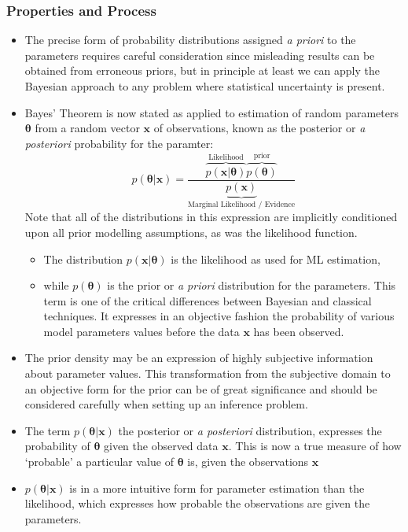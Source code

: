 \documentclass[12pt]{article}
\newcommand{\thetab}{\boldsymbol{\theta}}
\newcommand{\xb}{\mathbf{x}}
\begin{document}
\subsubsection{Properties and Process}
\begin{itemize}
    \item The precise form of probability distributions assigned \textit{a priori} to the parameters requires careful consideration since misleading results can be obtained from erroneous priors, but in principle at least we can apply the Bayesian approach to any problem where statistical uncertainty is present.
    \item Bayes' Theorem is now stated as applied to estimation of random parameters $\thetab$ from a random vector $\xb$ of observations, known as the posterior or \textit{a posteriori} probability for the paramter:
    \[
    p(\thetab | \xb) = \frac{\overbrace{p(\xb | \thetab)}^{\textrm{Likelihood}}  \overbrace{p(\thetab)}^{\textrm{prior}}}{\underbrace{p(\xb)}_{\textrm{Marginal Likelihood / Evidence}}}
    \]
    Note that all of the distributions in this expression are implicitly conditioned upon all prior modelling assumptions, as was the likelihood function.
    \begin{itemize}
        \item The distribution $p(\xb | \thetab)$ is the likelihood as used for ML estimation,
        \item while $p(\thetab)$ is the prior or \textit{a priori} distribution for the parameters. This term is one of the critical differences between Bayesian and classical techniques. It expresses in an objective fashion the probability of various model parameters values before the data $\xb$ has been observed.             
    \end{itemize}
      \item The prior density may be an expression of highly subjective information about parameter values. This transformation from the subjective domain to an objective form for the prior can be of great significance and should be considered carefully when setting up an inference problem.
      \item The term $p(\thetab | \xb)$ the posterior or \textit{a posteriori} distribution, expresses the probability of $\thetab$ given the observed data $\xb$. This is now a true measure of how `probable' a particular value of $\thetab$ is, given the observations $\xb$
      \item $p(\thetab | \xb)$ is in a more intuitive form for parameter estimation than the likelihood, which expresses how probable the observations are given the parameters.

\end{itemize}
\end{document}
